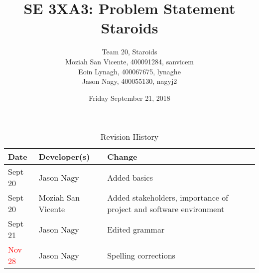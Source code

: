\documentclass{article}
\title{SE 3XA3: Problem Statement\\Staroids}
\author{Team 20, Staroids
		\\ Moziah San Vicente, 400091284, sanvicem
		\\ Eoin Lynagh, 400067675, lynaghe
		\\ Jason Nagy, 400055130, nagyj2
}
\date{Friday September 21, 2018}
\begin{document}
\begin{table}[hp]
\caption{Revision History} \label{TblRevisionHistory}
\begin{tabularx}{\textwidth}{llX}
\toprule
\textbf{Date} & \textbf{Developer(s)} & \textbf{Change}\\
\midrule
Sept 20 & Jason Nagy & Added basics\\
Sept 20 & Moziah San Vicente & Added stakeholders, importance of project and software environment\\
Sept 21 & Jason Nagy & Edited grammar\\
\textcolor{red}{Nov 28} & Jason Nagy & Spelling corrections\\
\bottomrule
\end{tabularx}
\end{table}

\newpage

\maketitle
\end{document}

